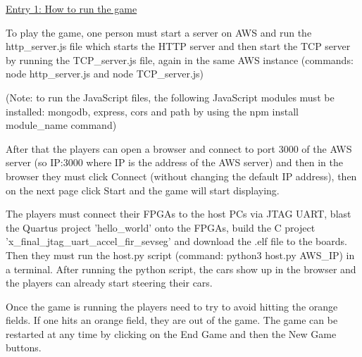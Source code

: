 \documentclass[12pt,a4paper]{article}
\begin{document}
\underline{\scriptsize Entry 1: How to run the game}
\par
{\scriptsize To play the game, one person must start a server on AWS and run the http\_server.js 
file which starts the HTTP server and then start the TCP server by running the 
TCP\_server.js file, again in the same AWS instance (commands: 
node http\_server.js and node TCP\_server.js)
\par
(Note: to run the JavaScript files, the following JavaScript modules must be 
installed: mongodb, express, cors and path by using the 
npm install module\_name command)
\par
After that the players can open a browser and connect to port 3000 of the AWS server 
(so IP:3000 where IP is the address of the AWS server) and then in the browser they 
must click Connect (without changing the default IP address), then on the next page 
click Start and the game will start displaying.
\par
The players must connect their FPGAs to the host PCs via JTAG UART, blast the Quartus 
project 'hello\_world' onto the FPGAs, build the C project 'x\_final\_jtag\_uart\_accel\_fir\_sevseg' 
and download the .elf file to the boards. 
Then they must run the host.py script (command: python3 host.py {AWS\_IP}) in a 
terminal. After running the python script, the cars show up in the browser and the 
players can already start steering their cars.
\par
Once the game is running the players need to try to avoid hitting the orange fields. 
If one hits an orange field, they are out of the game. The game can be restarted at 
any time by clicking on the End Game and then the New Game buttons.}
\end{document}
